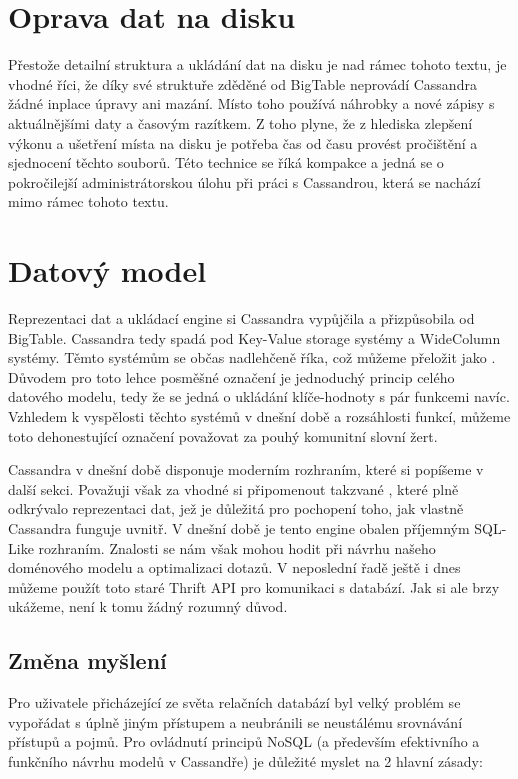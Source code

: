\section{Oprava dat na disku}
Přestože detailní struktura a ukládání dat na disku je nad rámec tohoto textu, je vhodné říci, že díky své struktuře zděděné od BigTable neprovádí Cassandra žádné inplace úpravy ani mazání. Místo toho používá náhrobky a nové zápisy s aktuálnějšími daty a časovým razítkem. Z toho plyne, že z hlediska zlepšení výkonu a ušetření místa na disku je potřeba čas od času provést pročištění a sjednocení těchto  souborů. Této technice se říká kompakce a jedná se o pokročilejší administrátorskou úlohu při práci s Cassandrou, která se nachází mimo rámec tohoto textu. %

\section{Datový model}
Reprezentaci dat a ukládací engine si Cassandra vypůjčila a přizpůsobila od BigTable. Cassandra tedy spadá pod Key-Value storage systémy a WideColumn systémy. Těmto systémům se občas nadlehčeně říka, což můžeme přeložit jako . Důvodem pro toto lehce posměšné označení je jednoduchý princip celého datového modelu, tedy že se jedná  o ukládání klíče-hodnoty s pár funkcemi navíc. Vzhledem k vyspělosti těchto systémů v dnešní době a rozsáhlosti funkcí, můžeme toto dehonestující označení považovat za pouhý komunitní slovní žert.

Cassandra v dnešní době disponuje moderním rozhraním, které si popíšeme v další sekci. Považuji však za vhodné si připomenout takzvané , které plně odkrývalo reprezentaci dat, jež je důležitá pro pochopení toho, jak vlastně Cassandra funguje uvnitř. V dnešní době je tento engine obalen příjemným SQL-Like rozhraním. Znalosti  se nám však mohou hodit při návrhu našeho doménového modelu a optimalizaci dotazů. V neposlední řadě ještě i dnes můžeme použít toto staré Thrift API pro komunikaci s databází. Jak si ale brzy ukážeme, není k tomu žádný rozumný důvod. 

\subsection{Změna myšlení}
Pro uživatele přicházející ze světa relačních databází byl velký problém se vypořádat s úplně jiným přístupem a neubránili se neustálému srovnávání přístupů a pojmů. Pro ovládnutí principů NoSQL (a především efektivního a funkčního návrhu modelů v Cassandře) je důležité myslet na 2 hlavní zásady: 

